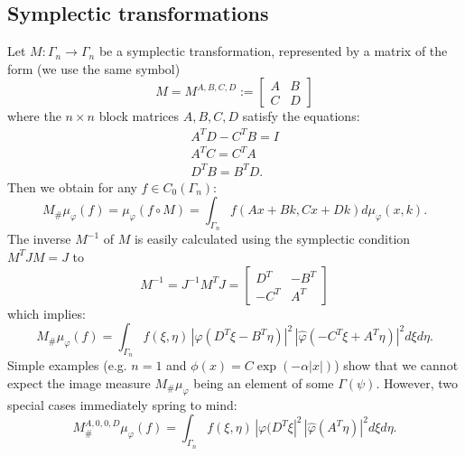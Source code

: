 \documentclass[12pt,a4paper]{article}
\begin{document}
\subsection{Symplectic transformations}\label{sympl_trafos}
Let $M:\Gamma_n \rightarrow \Gamma_n$ be a symplectic transformation, represented
by a matrix of the form (we use the same symbol)
\begin{displaymath}
          M=M^{A,B,C,D}:=\begin{bmatrix}
          A & B \\ 
          C & D
          \end{bmatrix} 
\end{displaymath}
where the $n\times n$ block matrices $A,B,C,D$ satisfy the equations:
\begin{displaymath}
         \begin{array}{c}
          A^T D - C^T B = I \\
          A^T C = C^T A \\ 
          D^T B = B^T D. 
         \end{array} 
\end{displaymath}
Then we obtain for any $f\in C_0({\Gamma_n})$:
\begin{displaymath}
      M_{\#}\mu_{\varphi}(f) = \mu_{\varphi}(f\circ M) = 
         \int_{\Gamma_n} f(A x+B k, C x + D k) d\mu_{\varphi}(x,k).
\end{displaymath}
The inverse $M^{-1}$ of $M$ is easily calculated using the symplectic
condition $M^T J M = J$ to
\begin{displaymath}
           M^{-1}=J^{-1} M^T J = \begin{bmatrix}
          D^T & -B^T \\ 
          -C^T & A^T
          \end{bmatrix}
\end{displaymath}
which implies:
\begin{displaymath}
      M_{\#}\mu_{\varphi}(f) =  \int_{\Gamma_n} f(\xi,\eta)\,
      |\varphi(D^T \xi - B^T \eta)|^2 \,
      |\hat\varphi(-C^T \xi + A^T \eta)|^2 d\xi d\eta.       
\end{displaymath}
Simple examples (e.g. $n=1$ and $\phi(x)=C \exp(-\alpha |x|)$) show that 
we cannot expect the image measure $M_{\#}\mu_{\varphi}$ being an element of some
$\Gamma(\psi)$. However, two special cases immediately spring to mind:
\begin{displaymath}
          M^{A,0,0,D}_{\#}\mu_{\varphi}(f) =  \int_{\Gamma_n} f(\xi,\eta)\,
      |\varphi(D^T \xi|^2 \,
      |\hat\varphi(A^T \eta)|^2 d\xi d\eta. 
\end{displaymath}
\end{document}
